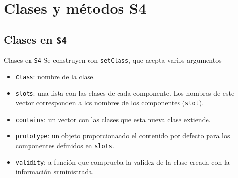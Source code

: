 \documentclass[xcolor={usenames,svgnames,dvipsnames}]{beamer}
\begin{document}
\section{Clases y métodos S4}
\label{sec:org27c53e9}

\subsection{Clases en \texttt{S4}}
\label{sec:orga483c45}
\begin{frame}[fragile,label={sec:org13da45a}]{Clases en \texttt{S4}}
 Se construyen con \texttt{setClass}, que acepta varios argumentos
\begin{itemize}
\item \texttt{Class}: nombre de la clase.
\item \texttt{slots}: una lista con las clases de cada componente. Los nombres de este vector corresponden a los nombres de los componentes (\texttt{slot}).
\item \texttt{contains}: un vector con las clases que esta nueva clase extiende.
\item \texttt{prototype}: un objeto proporcionando el contenido por defecto para los componentes definidos en \texttt{slots}.
\item \texttt{validity}: a función que comprueba la validez de la clase creada con la información suministrada.
\end{itemize}
\end{frame}
\end{document}

